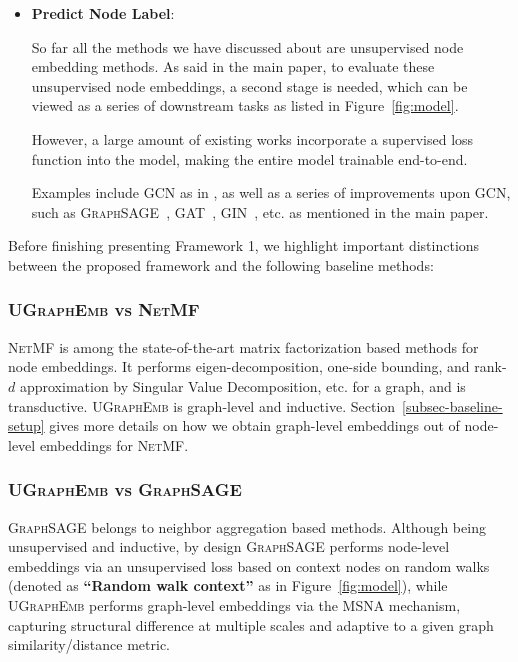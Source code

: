\documentclass{article}
\newcommand{\model}{\textsc{UGraphEmb}\xspace}
\newcommand{\netmf}{\textsc{NetMF}\xspace}
\newcommand{\graphsage}{\textsc{GraphSAGE}\xspace}
\newcommand{\gcn}{\textsc{GCN}\xspace}
\begin{document}
\begin{itemize}
    
    
    


    
    
    
    \item \textbf{{Predict Node Label}}: 
    
    So far all the methods we have discussed about are unsupervised node embedding methods. As said in the main paper, to evaluate these unsupervised node embeddings, a second stage is needed, which can be viewed as a series of downstream  tasks as listed in Figure~\ref{fig:model}.
    
    However, a large amount of existing works incorporate a supervised loss function into the model, making the entire model trainable end-to-end. 
    
    Examples include \gcn as in \cite{kipf2016variational}, as well as a series of improvements upon \gcn, such as \textsc{GraphSAGE}~\cite{hamilton2017inductive}, \textsc{GAT}~\cite{velickovic2017graph}, \textsc{GIN}~\cite{xu2018powerful}, etc. as mentioned in the main paper.
\end{itemize}

Before finishing presenting Framework 1, we highlight important distinctions between the proposed framework and the following baseline methods:

\subsubsection{\model vs \netmf}

\netmf is among the state-of-the-art matrix factorization based methods for node embeddings. It performs eigen-decomposition, one-side bounding, and rank-$d$ approximation by Singular Value Decomposition, etc. for a graph, and is transductive. \model is graph-level and inductive. Section~\ref{subsec-baseline-setup} gives more details on how we obtain graph-level embeddings out of node-level embeddings for \netmf.

\subsubsection{\model vs \graphsage}

\graphsage belongs to neighbor aggregation based methods. 
Although being unsupervised and inductive, by design \graphsage performs node-level embeddings via an unsupervised loss based on context nodes on random walks (denoted as {\textbf{``Random walk context''}} as in Figure~\ref{fig:model}), while \model performs graph-level embeddings via the MSNA mechanism, capturing structural difference at multiple scales and adaptive to a given graph similarity/distance metric. 
\end{document}
